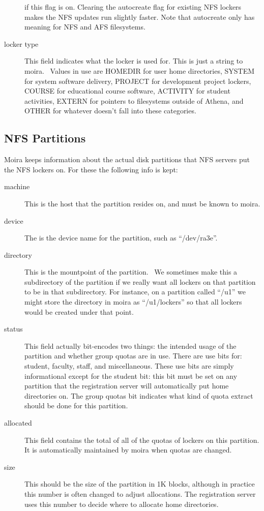 \documentclass{book}
\begin{document}
\begin{description}
if this flag is on.  Clearing the autocreate flag for existing NFS
lockers makes the NFS updates run slightly faster.  Note that
autocreate only has meaning for NFS and AFS filesystems.  
\item[locker type] This field indicates what the locker is used for.  This
is just a string to moira.  \athena\ Values in use are HOMEDIR for
user home directories, SYSTEM for system software delivery, PROJECT
for development project lockers, COURSE for educational course
software, ACTIVITY for student activities, EXTERN for pointers to
filesystems outside of Athena, and OTHER for whatever doesn't fall
into these categories.  
\end{description}

\subsection{NFS Partitions}

\label{nfspartitions}
Moira keeps information about the actual disk partitions that NFS
servers put the NFS lockers on.  For these the following info is kept:
\begin{description}
\item[machine] This is the host that the partition resides on, and must be
known to moira.
\item[device] The is the device name for the partition, such as ``/dev/ra3e''.
\item[directory] This is the mountpoint of the partition.  \athena\  We
sometimes make this a subdirectory of the partition if we really want
all lockers on that partition to be in that subdirectory.  For
instance, on a partition called ``/u1'' we might store the directory
in moira as ``/u1/lockers'' so that all lockers would be created under
that point.
\item[status] This field actually bit-encodes two things: the intended usage
of the partition and whether group quotas are in use.  There are use
bits for: student, faculty, staff, and miscellaneous.  These use bits
are simply informational except for the student bit: this bit must be
set on any partition that the  registration server
will automatically put home directories on.   The
group quotas bit indicates what kind of quota extract should be done
for this partition.
\item[allocated] This field contains the total of all of the quotas of
lockers on this partition.  It is automatically maintained by moira
when quotas are changed.
\item[size] This should be the size of the partition in 1K blocks, although
in practice this number is often changed to adjust allocations.  The
registration server uses this number to decide where to allocate home
directories. 
\end{description}
\end{document}
